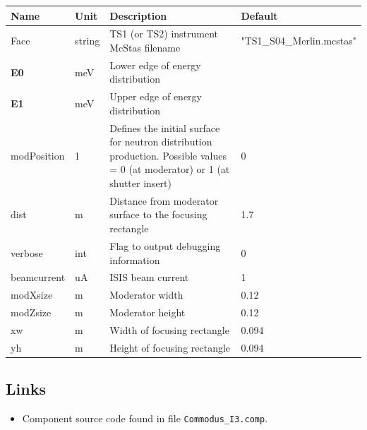 \begin{longtable}{p{}p{}p{}p{}}
\toprule
\textbf{Name} & \textbf{Unit} & \textbf{Description} & \textbf{Default} \\
\midrule
\endhead
Face & string & TS1 (or TS2) instrument McStas filename & "TS1\_S04\_Merlin.mcstas" \\
\textbf{E0} & meV & Lower edge of energy distribution &  \\
\textbf{E1} & meV & Upper edge of energy distribution &  \\
modPosition & 1 & Defines the initial surface for neutron distribution production. Possible values = 0 (at moderator) or 1 (at shutter insert) & 0 \\
dist & m & Distance from moderator surface to the focusing rectangle & 1.7 \\
verbose & int & Flag to output debugging information & 0 \\
beamcurrent & uA & ISIS beam current & 1 \\
modXsize & m & Moderator width & 0.12 \\
modZsize & m & Moderator height & 0.12 \\
xw & m & Width of focusing rectangle & 0.094 \\
yh & m & Height of focusing rectangle & 0.094 \\
\bottomrule
\end{longtable}

\subsection*{Links}
\begin{itemize}
  \item Component source code found in file \texttt{Commodus\_I3.comp}.
\end{itemize}

